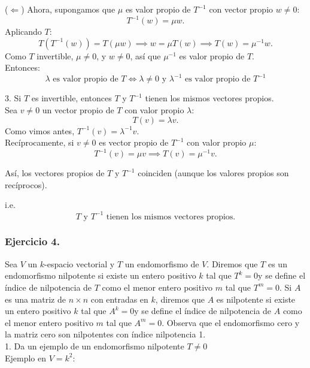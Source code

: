 \documentclass{article}
\theoremstyle{nonumberplain}
\begin{document}
(\( \Leftarrow \))  
Ahora, supongamos que \( \mu \) es valor propio de \( T^{-1} \) con vector propio \( w \neq 0 \):
\[
T^{-1}(w) = \mu w.
\]
Aplicando \( T \):
\[
T(T^{-1}(w)) = T(\mu w) \implies w = \mu T(w) \implies T(w) = \mu^{-1} w.
\]
Como \( T \) invertible, \( \mu \neq 0 \), y \( w \neq 0 \), así que \( \mu^{-1} \) es valor propio de \( T \). \\

Entonces:
\[
\boxed{
\lambda \text{ es valor propio de } T \iff \lambda \neq 0 \text{ y } \lambda^{-1} \text{ es valor propio de } T^{-1}
}
\]

3. Si \( T \) es invertible, entonces \( T \) y \( T^{-1} \) tienen los mismos vectores propios. \\
Sea \( v \neq 0 \) un vector propio de \( T \) con valor propio \( \lambda \):
\[
T(v) = \lambda v.
\]
Como vimos antes, \( T^{-1}(v) = \lambda^{-1} v \). \\

Recíprocamente, si \( v \neq 0 \) es vector propio de \( T^{-1} \) con valor propio \( \mu \):
\[
T^{-1}(v) = \mu v \implies T(v) = \mu^{-1} v.
\]

Así, los vectores propios de \( T \) y \( T^{-1} \) coinciden (aunque los valores propios son recíprocos).

i.e.
\[
\boxed{
T \text{ y } T^{-1} \text{ tienen los mismos vectores propios.}
}
\]

\subsubsection*{Ejercicio 4.} Sea \( V \) un \( k \)-espacio vectorial y \( T \) un endomorfismo de \( V \). Diremos que \( T \) es un endomorfismo nilpotente si existe un entero positivo \( k \) tal que \( T^{k}=0 \mathrm{y} \) se define el índice de nilpotencia de \( T \) como el menor entero positivo \( m \) tal que \( T^{m}=0 \).
Si \( A \) es una matriz de \( n \times n \) con entradas en \( k \), diremos que \( A \) es nilpotente si existe un entero positivo \( k \) tal que \( A^{k}=0 \mathrm{y} \) se define el índice de nilpotencia de \( A \) como el menor entero positivo \( m \) tal que \( A^{m}=0 \).
Observa que el endomorfismo cero y la matriz cero son nilpotentes con índice nilpotencia 1. \\
1. Da un ejemplo de un endomorfismo nilpotente \( T \neq 0 \) \\

Ejemplo en \( V = k^2 \): \\
\end{document}
